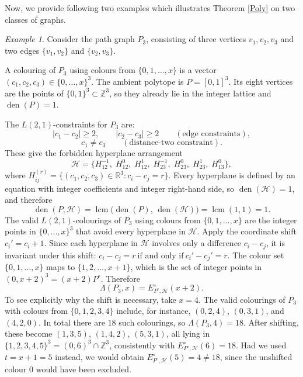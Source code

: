 \documentclass{birkjour}
\theoremstyle{definition}
\theoremstyle{remark}
\newtheorem*{example}{Example}
\numberwithin{equation}{section}
\begin{document}
Now, we provide following two examples which illustrates Theorem \ref{Poly} on two classes of graphs.

\begin{example}
Consider the path graph \( P_3 \), consisting of three vertices \( v_1, v_2, v_3 \)
and two edges \( \{v_1,v_2\} \) and \( \{v_2,v_3\} \).
 
A colouring of \( P_3 \) using colours from \( \{0,1,\dots,x\} \) is a
vector \( (c_1,c_2,c_3) \in \{0,\dots,x\}^3 \).
The ambient polytope is \( P = [0,1]^3 \).
Its eight vertices are the points of \( \{0,1\}^3 \subset \mathbb{Z}^3 \),
so they already lie in the integer lattice and
\( \operatorname{den}(P) = 1 \).
 
The \( L(2,1) \)-constraints for \( P_3 \) are:
\[
|c_1 - c_2| \geq 2, \qquad |c_2 - c_3| \geq 2
\qquad (\text{edge constraints}),
\]
\[
c_1 \neq c_3 \qquad (\text{distance-two constraint}).
\]
These give the forbidden hyperplane arrangement
\[
\mathcal{H} = \bigl\{
  H_{12}^{-1},\; H_{12}^{0},\; H_{12}^{1},\;
  H_{23}^{-1},\; H_{23}^{0},\; H_{23}^{1},\;
  H_{13}^{0}
\bigr\},
\]
where \( H_{ij}^{(r)} = \{(c_1,c_2,c_3)\in\mathbb{R}^3 : c_i - c_j = r\} \).
Every hyperplane is defined by an equation with integer coefficients and
integer right-hand side, so \( \operatorname{den}(\mathcal{H}) = 1 \),
and therefore
\[
\operatorname{den}(P,\mathcal{H})
= \operatorname{lcm}\!\bigl(\operatorname{den}(P),\,
  \operatorname{den}(\mathcal{H})\bigr)
= \operatorname{lcm}(1,1) = 1.
\]
The valid \( L(2,1) \)-colourings of \( P_3 \) using colours from
\( \{0,1,\dots,x\} \) are the integer points in \( \{0,\dots,x\}^3 \)
that avoid every hyperplane in \( \mathcal{H} \).
Apply the coordinate shift \( c_i' = c_i + 1 \).
Since each hyperplane in \( \mathcal{H} \) involves only a difference
\( c_i - c_j \), it is invariant under this shift:
\( c_i - c_j = r ~\text{if and only if}~ c_i' - c_j' = r \).
The colour set \( \{0,1,\dots,x\} \) maps to \( \{1,2,\dots,x+1\} \),
which is the set of integer points in \( (0,x+2)^3 = (x+2)P^{\circ} \).
Therefore
\[
\Lambda(P_3, x) = E^{\circ}_{P^{\circ},\mathcal{H}}(x+2).
\]
To see explicitly why the shift is necessary, take \( x = 4 \).
The valid colourings of \( P_3 \) with colours from \( \{0,1,2,3,4\} \)
include, for instance, \( (0,2,4) \), \( (0,3,1) \), and \( (4,2,0) \).
In total there are \( 18 \) such colourings, so \( \Lambda(P_3,4) = 18 \).
After shifting, these become \( (1,3,5) \), \( (1,4,2) \), \( (5,3,1) \),
all lying in \( \{1,2,3,4,5\}^3 = (0,6)^3 \cap \mathbb{Z}^3 \),
consistently with \( E^{\circ}_{P^{\circ},\mathcal{H}}(6) = 18 \).
Had we used \( t = x+1 = 5 \) instead, we would obtain
\( E^{\circ}_{P^{\circ},\mathcal{H}}(5) = 4 \neq 18 \), since the
unshifted colour \( 0 \) would have been excluded.
 

\end{example}
\end{document}

